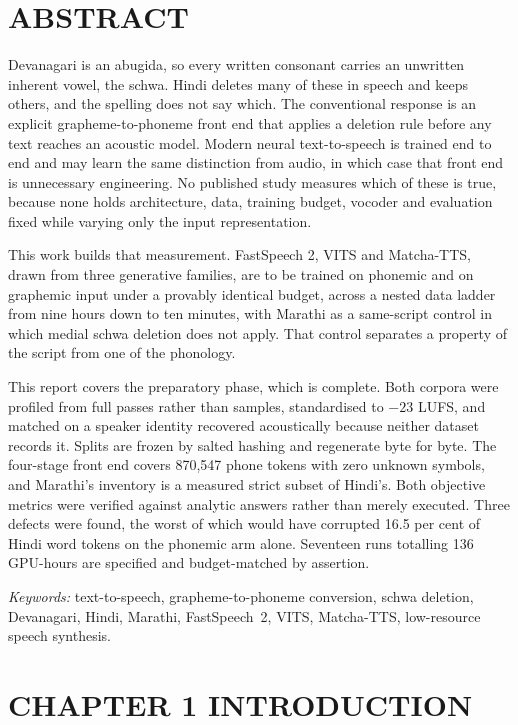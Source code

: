 \documentclass[12pt,a4paper]{article}
\begin{document}
\section*{\centering ABSTRACT}
Devanagari is an abugida, so every written consonant carries an unwritten inherent vowel, the schwa. Hindi deletes many of these in speech and keeps others, and the spelling does not say which. The conventional response is an explicit grapheme-to-phoneme front end that applies a deletion rule before any text reaches an acoustic model. Modern neural text-to-speech is trained end to end and may learn the same distinction from audio, in which case that front end is unnecessary engineering. No published study measures which of these is true, because none holds architecture, data, training budget, vocoder and evaluation fixed while varying only the input representation.

This work builds that measurement. FastSpeech 2, VITS and Matcha-TTS, drawn from three generative families, are to be trained on phonemic and on graphemic input under a provably identical budget, across a nested data ladder from nine hours down to ten minutes, with Marathi as a same-script control in which medial schwa deletion does not apply. That control separates a property of the script from one of the phonology.

This report covers the preparatory phase, which is complete. Both corpora were profiled from full passes rather than samples, standardised to $-23$ LUFS, and matched on a speaker identity recovered acoustically because neither dataset records it. Splits are frozen by salted hashing and regenerate byte for byte. The four-stage front end covers 870,547 phone tokens with zero unknown symbols, and Marathi’s inventory is a measured strict subset of Hindi’s. Both objective metrics were verified against analytic answers rather than merely executed. Three defects were found, the worst of which would have corrupted 16.5 per cent of Hindi word tokens on the phonemic arm alone. Seventeen runs totalling 136 GPU-hours are specified and budget-matched by assertion.

\vspace{6pt}\noindent\textit{Keywords:} text-to-speech, grapheme-to-phoneme conversion, schwa deletion, Devanagari, Hindi, Marathi, FastSpeech~2, VITS, Matcha-TTS, low-resource speech synthesis.
\clearpage
{}\setcounter{page}{1}

\section*{CHAPTER 1  INTRODUCTION}
\end{document}
